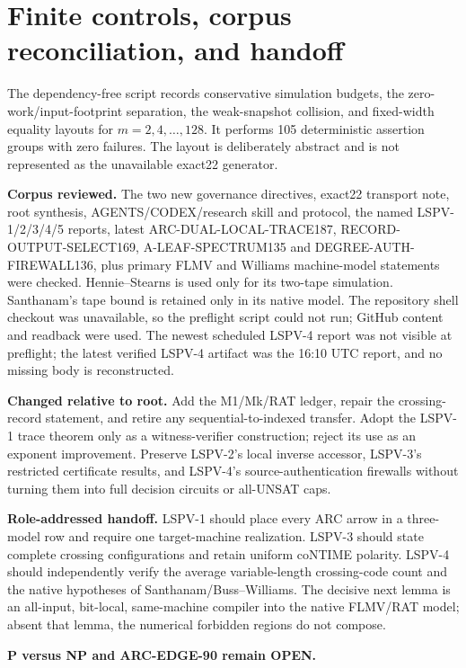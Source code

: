 \documentclass[11pt]{article}
\begin{document}
\section{Finite controls, corpus reconciliation, and handoff}
The dependency-free script
records conservative simulation budgets, the zero-work/input-footprint
separation, the weak-snapshot collision, and fixed-width equality layouts for
$m=2,4,\ldots,128$.  It performs 105 deterministic assertion groups with
zero failures.  The layout is deliberately abstract and is not represented as
the unavailable exact22 generator.

\textbf{Corpus reviewed.}  The two new governance directives, exact22
transport note, root synthesis, AGENTS/CODEX/research skill and protocol,
the named LSPV-1/2/3/4/5 reports, latest ARC-DUAL-LOCAL-TRACE187,
RECORD-OUTPUT-SELECT169, A-LEAF-SPECTRUM135 and
DEGREE-AUTH-FIREWALL136, plus primary FLMV and Williams machine-model
statements were checked.  Hennie--Stearns is used only for its two-tape
simulation.  Santhanam's tape bound is retained only in its native model.
The repository shell checkout was unavailable, so the preflight script could
not run; GitHub content and readback were used.  The newest scheduled LSPV-4
report was not visible at preflight; the latest verified LSPV-4 artifact was
the 16:10 UTC report, and no missing body is reconstructed.

\textbf{Changed relative to root.}  Add the M1/Mk/RAT ledger, repair the
crossing-record statement, and retire any sequential-to-indexed transfer.
Adopt the LSPV-1 trace theorem only as a witness-verifier construction; reject
its use as an exponent improvement.  Preserve LSPV-2's local inverse accessor,
LSPV-3's restricted certificate results, and LSPV-4's source-authentication
firewalls without turning them into full decision circuits or all-UNSAT caps.

\textbf{Role-addressed handoff.}  LSPV-1 should place every ARC arrow in a
three-model row and require one target-machine realization.  LSPV-3 should
state complete crossing configurations and retain uniform coNTIME polarity.
LSPV-4 should independently verify the average variable-length crossing-code
count and the native hypotheses of Santhanam/Buss--Williams.  The decisive
next lemma is an all-input, bit-local, same-machine compiler into the native
FLMV/RAT model; absent that lemma, the numerical forbidden regions do not
compose.

\noindent\textbf{P versus NP and ARC-EDGE-90 remain OPEN.}
\end{document}
